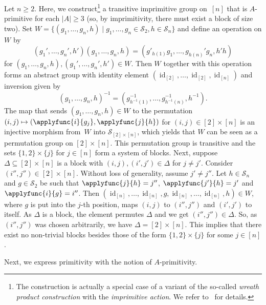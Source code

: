 \begin{example} 
	\label{syncaut:permgrp:ex:threesets}
	Let $n \ge 2$.  
	Here, we construct\footnote{The construction  
		is actually a special case
		of a variant of the so-called \emph{wreath product construction} 
		with the \emph{imprimitive action}.
		We refer to~\cite{cameron_1999,dixon1996permutation}
		for details.} a transitive imprimitive group on~$[n]$ that is $A$-primitive for each $|A| \ge 3$
	(so, by imprimitivity, there must exist a block of size two).
	Set $W = \{ (g_1, \ldots, g_n, h) \mid g_1, \ldots, g_n \in \mathcal S_2, h \in \mathcal S_n \}$
	and define an operation on $W$ by
	\[
	(g_1', \ldots, g_n', h') (g_1, \ldots, g_n, h)
	= (g'_{h(1)} g_{1}, 
	\ldots, 
	g_{h(n)}' g_{n}, h'h)
	\]
	for $(g_1, \ldots, g_n, h), (g_1', \ldots, g_n', h') \in W$. 
	Then $W$ together with this operation 
	forms an abstract group with identity element $(\operatorname{id}_{[2]}, \ldots, \operatorname{id}_{[2]}, \operatorname{id}_{[n]})$ 
	and inversion given by
	\[
	(g_1, \ldots, g_n, h)^{-1}
	= (g_{h^{-1}(1)}^{-1}, \ldots, g_{h^{-1}(n)}^{-1}, h^{-1}).
	\]  
	The map that sends
	$(g_1, \ldots, g_n, h) \in W$ to the permutation 
	$(i,j) \mapsto (\applyfunc{i}{g_j}, \applyfunc{j}{h})$
	for $(i,j) \in [2] \times [n]$
	is an injective morphism from~$W$ into $\mathcal S_{[2] \times [n]}$,
	which yields that $W$
	can be seen as a permutation group on $[2] \times [n]$.
	This permutation group is transitive
	and the sets
	$
	\{1,2\} \times \{j\}
	$
	for $j \in [n]$ form a system of blocks.  
	Next, suppose $\Delta \subseteq [2] \times [n]$
	is a block with $(i, j), (i', j') \in \Delta$
	for $j \ne j'$. Consider $(i'', j'') \in [2] \times [n]$.
	Without loss of generality, assume $j' \ne j''$.
	Let $h \in \mathcal S_n$ and $g \in \mathcal S_2$ be
	such that  $\applyfunc{j}{h} = j''$, $\applyfunc{j'}{h} = j'$
	and $\applyfunc{i}{g} = i''$.
	Then
	$(\operatorname{id}_{[n]}, \ldots, \operatorname{id}_{[n]}, g, \operatorname{id}_{[n]}, \ldots, \operatorname{id}_{[n]}, h) \in W$, where $g$ is put into the $j$-th position, maps $(i,j)$ to $(i'',j'')$
	and $(i',j')$ to itself.
	As $\Delta$ is a block, the element  permutes $\Delta$ and we get $(i'', j'') \in \Delta$.
	So, as $(i'',j'')$ was chosen arbitrarily, we have $\Delta = [2] \times [n]$.
	This implies that there exist no non-trivial
	blocks besides those of the form $\{1,2\} \times \{j\}$
	for some $j \in [n]$.  
\end{example}

Next, we express primitivity with the notion of $A$-primitivity. 

